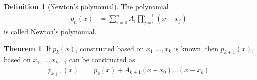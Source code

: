 \documentclass[fleqn, a4paper, 12pt, twoside, titlepage]{article}
\theoremstyle{definition}
\newtheorem{definition}{Definition}
\theoremstyle{theorem}
\newtheorem{theorem}{Theorem}
\begin{document}
\begin{definition}[Newton's polynomial]
	The polynomial
	\begin{align*}
		p_n(x) & = \sum\limits_{i = 0}^{n} A_i \prod\limits_{j = 0}^{i - 1} (x - x_j)
	\end{align*}
	is called Newton's polynomial.
\end{definition}

\begin{theorem}
	If $p_k(x)$, constructed based on $x_1,\dots,x_k$ is known, then $p_{k + 1}(x)$, based on $x_1,\dots,x_{k + 1}$ can be constructed as
	\begin{align*}
		p_{k + 1}(x) & = p_k(x) + A_{k + 1} (x - x_0) \dots (x - x_k)
	\end{align*}
\end{theorem}
\end{document}
